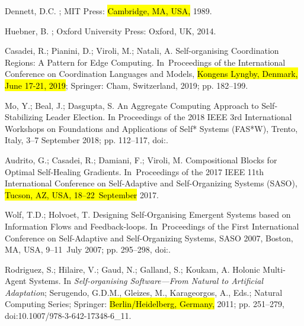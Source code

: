 \documentclass[jsan,article,accept,moreauthors,pdftex]{Definitions/mdpi}
\begin{document}
\begin{thebibliography}{999}
Dennett, D.C.
; MIT Press:  \hl{Cambridge, MA, USA,} %
  1989.

Huebner, B.
; Oxford University Press: Oxford, UK,  2014.

Casadei, R.; Pianini, D.; Viroli, M.; Natali, A.
\newblock Self-organising Coordination Regions: A Pattern for Edge Computing.
\newblock   In~Proceedings of the International Conference on Coordination Languages and Models, \hl{ Kongens Lyngby, Denmark, June 17-21, 2019}; %
 Springer: Cham, Switzerland,  2019; pp. 182--199.

Mo, Y.; Beal, J.; Dasgupta, S.
\newblock An Aggregate Computing Approach to Self-Stabilizing Leader Election.
\newblock  In Proceedings of the  2018 {IEEE} 3rd International Workshops on Foundations and
  Applications of Self* Systems (FAS*W), Trento, Italy, 3--7 September 2018; pp. 112--117,
\newblock
  doi:{\href{https://doi.org/10.1109/FAS-W.2018.00034}{}}.

Audrito, G.; Casadei, R.; Damiani, F.; Viroli, M.
\newblock Compositional Blocks for Optimal Self-Healing Gradients.
\newblock  In~Proceedings of the 2017 IEEE 11th International Conference on Self-Adaptive and Self-Organizing Systems (SASO), \hl{Tucson, AZ, USA, \mbox{18--22 September}} 2017.

Wolf, T.D.; Holvoet, T.
\newblock Designing Self-Organising Emergent Systems based on Information Flows
  and Feedback-loops.
\newblock  In~Proceedings of the First International Conference on Self-Adaptive
  and Self-Organizing Systems, {SASO} 2007, Boston, MA, USA, \mbox{9--11 July} 2007; pp. 295--298,
\newblock
  doi:{\href{https://doi.org/10.1109/SASO.2007.16}{}}.

Rodriguez, S.; Hilaire, V.; Gaud, N.; Galland, S.; Koukam, A.
\newblock Holonic Multi-Agent Systems. In {\em Self-organising Software---From
  Natural to Artificial Adaptation}; Serugendo, G.D.M., Gleizes, M.,
  Karageorgos, A., Eds.; Natural Computing Series; Springer:  \hl{Berlin/Heidelberg, Germany,} %
  2011; pp.
  251--279,
\newblock
  doi:10.1007/978-3-642-17348-6\_11.


\end{thebibliography}
\end{document}
